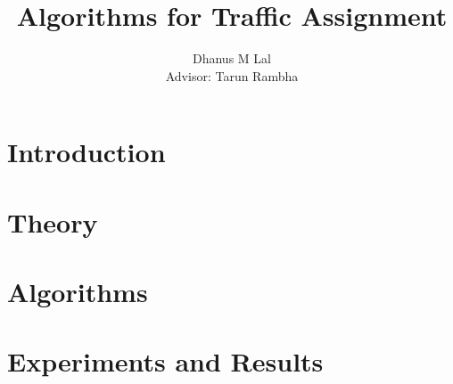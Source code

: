 \documentclass[12pt]{report}
\begin{document}
\begin{frontmatter}
\title{Algorithms for Traffic Assignment}
\author{Dhanus M Lal\\
	Advisor: Tarun Rambha}
\me
\iisclogotrue
\maketitle
\end{frontmatter}

\tableofcontents

\chapter{Introduction}


\chapter{Theory}\label{chapter:math}


\chapter{Algorithms}\label{chapter:alg}


\chapter{Experiments and Results}\label{chapter:results}


\nocite{tarun, boyles}


\end{document}
